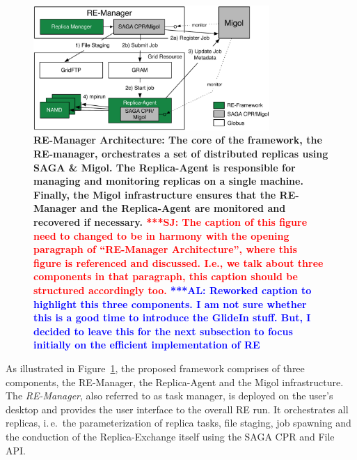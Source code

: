 \documentclass{rspublic}
\newcommand{\alnote}[1]{ {\textcolor{blue} { ***AL: #1 }}}
\newcommand{\jhanote}[1]{ {\textcolor{red} { ***SJ: #1 }}}
\newcommand{\alnote}[1]{}
\newcommand{\jhanote}[1]{}
\begin{document}
\begin{figure}[t]
      \centering
          \includegraphics[width=0.8\textwidth]{REMDgManager-architecture.pdf}
          \caption{\footnotesize \bf RE-Manager Architecture: The
            core of the framework, the RE-manager, orchestrates 
            a set of distributed replicas using SAGA \& Migol. 
            The Replica-Agent is responsible for managing and monitoring 
            replicas on a single machine. Finally, the Migol 
            infrastructure ensures that the RE-Manager and the Replica-Agent 
            are monitored and recovered if necessary.            
            \jhanote{The caption of this
              figure need to changed to be in harmony with the opening
              paragraph of ``RE-Manager Architecture'', where this
              figure is referenced and discussed. I.e., we talk about
              three components in that paragraph, this caption should
              be structured accordingly too.}
              \alnote{Reworked caption to highlight this three components. 
              I am not sure whether this is a good time to introduce the GlideIn stuff. But, I 
              decided to leave this for the next subsection to focus initially on
              the efficient implementation of RE}
              }
      \label{fig:REMD-Manager-architecture}
\end{figure}

As illustrated in Figure~\ref{fig:REMD-Manager-architecture}, the
proposed framework comprises of three components, the RE-Manager,
the Replica-Agent and the Migol infrastructure. 
The  \emph{RE-Manager}, also referred to as task manager,
is deployed on the user's desktop and provides the user interface 
to the overall RE run. It orchestrates all replicas, i.\,e.\ the 
parameterization of replica  tasks, file staging, job spawning 
and the conduction of the Replica-Exchange itself using the SAGA CPR
and File API.                                                                
\end{document}
